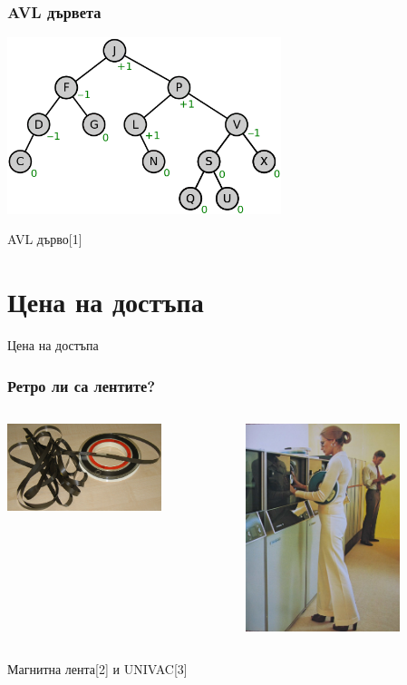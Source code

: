 \documentclass{beamer}
\begin{document}
  \begin{frame}[fragile]
  \frametitle{AVL дървета}
  
  \begin{center}
    \includegraphics[width=8cm]{images/bal_tree_avl}  
  \end{center}
  \centerline{AVL дърво[1]}
  
  \end{frame}
  
\section{Цена на достъпа}

\begin{frame}
  \centerline{Цена на достъпа}
\end{frame}

\begin{frame}[fragile]
  \frametitle{Ретро ли са лентите?}

\begin{columns}
  \begin{column}{0.5\textwidth}
      \includegraphics[width=4.5cm]{images/tape_old_1}
  \end{column}
  \begin{column}{0.5\textwidth}
       \includegraphics[width=4.5cm]{images/tape_old_2}
  \end{column}
\end{columns}
\bigskip
\centerline{Магнитна лента[2] и UNIVAC[3]}
\end{frame}
\end{document}
